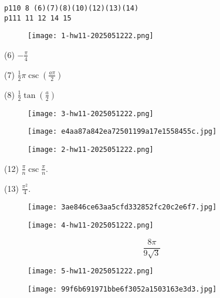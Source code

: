 \begin{lstlisting}
p110 8 (6)(7)(8)(10)(12)(13)(14)
p111 11 12 14 15
\end{lstlisting}
\begin{exercise}
\begin{figure}[H]
\centering
\texttt{[image: 1-hw11-2025051222.png]}
\label{}
\end{figure}
\end{exercise}
(6) $-\frac{\pi}{4}$

(7) $\frac{1}{2}\pi \csc\left( \frac{a\pi}{2} \right)$

(8) $\frac{1}{2}\tan\left( \frac{a}{2} \right)$

\begin{exercise}
\begin{figure}[H]
\centering
\texttt{[image: 3-hw11-2025051222.png]}
\label{}
\end{figure}
\end{exercise}
\begin{figure}[H]
\centering
\texttt{[image: e4aa87a842ea72501199a17e1558455c.jpg]}
\label{}
\end{figure}

\begin{exercise}
\begin{figure}[H]
\centering
\texttt{[image: 2-hw11-2025051222.png]}
\label{}
\end{figure}
\end{exercise}
(12) $\frac{\pi}{n}\csc \frac{\pi}{n}$.

(13) $\frac{\pi^{2}}{4}$.

\begin{figure}[H]
\centering
\texttt{[image: 3ae846ce63aa5cfd332852fc20c2e6f7.jpg]}
\label{}
\end{figure}

\begin{exercise}
\begin{figure}[H]
\centering
\texttt{[image: 4-hw11-2025051222.png]}
\label{}
\end{figure}
\end{exercise}
\[
\frac{8\pi}{9\sqrt{ 3 }}
\]
\begin{exercise}
\begin{figure}[H]
\centering
\texttt{[image: 5-hw11-2025051222.png]}
\label{}
\end{figure}
\end{exercise}
\begin{figure}[H]
\centering
\texttt{[image: 99f6b691971bbe6f3052a1503163e3d3.jpg]}
\label{}
\end{figure}

